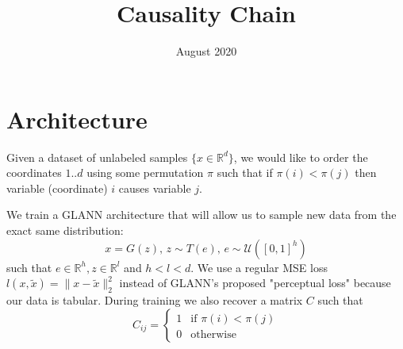 \documentclass{article}
\title{Causality Chain}
\author{}
\date{August 2020}
\newcommand{\RR}{\mathbb{R}}
\begin{document}
\maketitle

\section{Architecture}

Given a dataset of unlabeled samples $\{x\in \mathbb{R}^d\}$, we would like to order the coordinates $1..d$ using some permutation $\pi$ such that if $\pi(i)<\pi(j)$ then variable (coordinate) $i$ causes variable $j$.

We train a GLANN \cite{GLANN} architecture that will allow us to sample new data from the exact same distribution:
\begin{equation}
	x = G(z),\, z \sim T(e), \, e \sim \mathcal U ([0,1]^h)
\end{equation}
such that $e \in \RR^{h}, z \in \RR^{l}$ and $h < l <d$.
We use a regular MSE loss $l(x, \tilde x) = \| x - \tilde x \|_2^2$ instead of GLANN's \cite{GLANN} proposed "perceptual loss" because our data is tabular. 
During training we also recover a matrix $C$ such that
  \begin{equation}
    C_{ij} =  \begin{cases} 1 &\mbox{if } \pi(i)<\pi(j) \\
0 & \mbox{otherwise} \end{cases}
  \end{equation}
\end{document}
